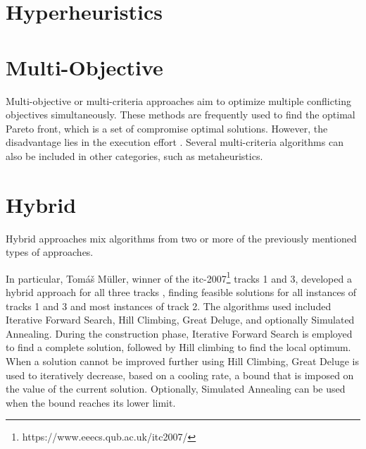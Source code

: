 
\section{Hyperheuristics}



\section{Multi-Objective}

Multi-objective or multi-criteria approaches aim to optimize multiple conflicting objectives simultaneously. These methods are frequently used to find the optimal Pareto front, which is a set of compromise optimal solutions. However, the disadvantage lies in the execution effort \cite{chen_survey_2021}. Several multi-criteria algorithms can also be included in other categories, such as metaheuristics.

\section{Hybrid}

Hybrid approaches mix algorithms from two or more of the previously mentioned types of approaches.


In particular, Tomáš Müller, winner of the \ac{itc-2007}\footnote{https://www.eeecs.qub.ac.uk/itc2007/} tracks 1 and 3, developed a hybrid approach for all three tracks \cite{muller_itc2007}, finding feasible solutions for all instances of tracks 1 and 3 and most instances of track 2. The algorithms used included Iterative Forward Search, Hill Climbing, Great Deluge, and optionally Simulated Annealing. During the construction phase, Iterative Forward Search is employed to find a complete solution, followed by Hill climbing to find the local optimum. When a solution cannot be improved further using Hill Climbing, Great Deluge is used to iteratively decrease, based on a cooling rate, a bound that is imposed on the value of the current solution. Optionally, Simulated Annealing can be used when the bound reaches its lower limit.

